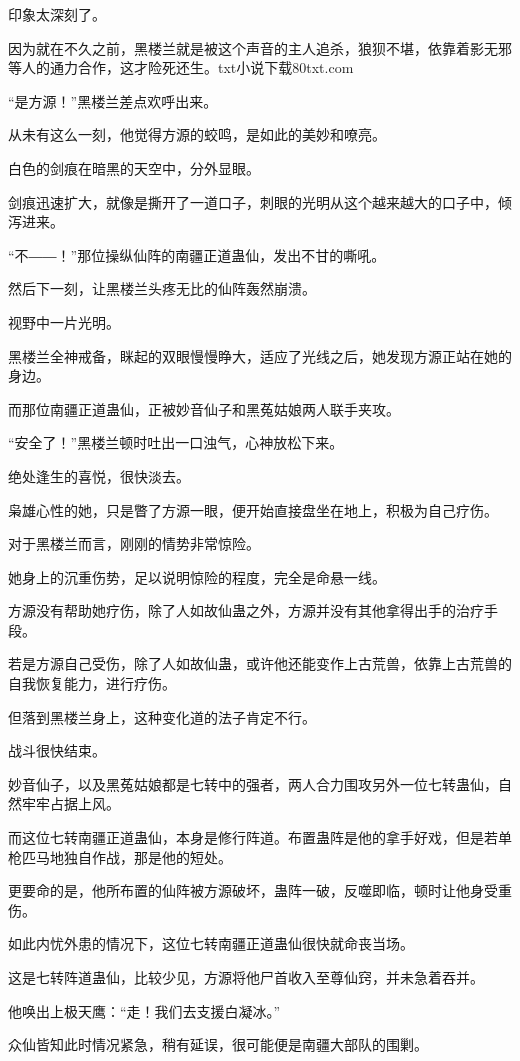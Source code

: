 \begin{this_body}
印象太深刻了。

因为就在不久之前，黑楼兰就是被这个声音的主人追杀，狼狈不堪，依靠着影无邪等人的通力合作，这才险死还生。txt小说下载80txt.com

“是方源！”黑楼兰差点欢呼出来。

从未有这么一刻，他觉得方源的蛟鸣，是如此的美妙和嘹亮。

白色的剑痕在暗黑的天空中，分外显眼。

剑痕迅速扩大，就像是撕开了一道口子，刺眼的光明从这个越来越大的口子中，倾泻进来。

“不――！”那位操纵仙阵的南疆正道蛊仙，发出不甘的嘶吼。

然后下一刻，让黑楼兰头疼无比的仙阵轰然崩溃。

视野中一片光明。

黑楼兰全神戒备，眯起的双眼慢慢睁大，适应了光线之后，她发现方源正站在她的身边。

而那位南疆正道蛊仙，正被妙音仙子和黑菟姑娘两人联手夹攻。

“安全了！”黑楼兰顿时吐出一口浊气，心神放松下来。

绝处逢生的喜悦，很快淡去。

枭雄心性的她，只是瞥了方源一眼，便开始直接盘坐在地上，积极为自己疗伤。

对于黑楼兰而言，刚刚的情势非常惊险。

她身上的沉重伤势，足以说明惊险的程度，完全是命悬一线。

方源没有帮助她疗伤，除了人如故仙蛊之外，方源并没有其他拿得出手的治疗手段。

若是方源自己受伤，除了人如故仙蛊，或许他还能变作上古荒兽，依靠上古荒兽的自我恢复能力，进行疗伤。

但落到黑楼兰身上，这种变化道的法子肯定不行。

战斗很快结束。

妙音仙子，以及黑菟姑娘都是七转中的强者，两人合力围攻另外一位七转蛊仙，自然牢牢占据上风。

而这位七转南疆正道蛊仙，本身是修行阵道。布置蛊阵是他的拿手好戏，但是若单枪匹马地独自作战，那是他的短处。

更要命的是，他所布置的仙阵被方源破坏，蛊阵一破，反噬即临，顿时让他身受重伤。

如此内忧外患的情况下，这位七转南疆正道蛊仙很快就命丧当场。

这是七转阵道蛊仙，比较少见，方源将他尸首收入至尊仙窍，并未急着吞并。

他唤出上极天鹰：“走！我们去支援白凝冰。”

众仙皆知此时情况紧急，稍有延误，很可能便是南疆大部队的围剿。


\end{this_body}
